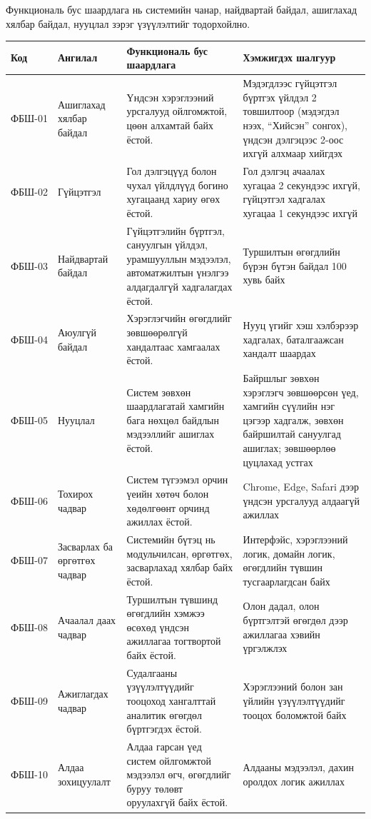 Функциональ бус шаардлага нь системийн чанар, найдвартай байдал, ашиглахад хялбар байдал, нууцлал зэрэг үзүүлэлтийг тодорхойлно.

\begin{longtable}{|L{1.1cm}|L{2.8cm}|L{5.5cm}|L{3.5cm}|}
\hline
\textbf{Код} & \textbf{Ангилал} & \textbf{Функциональ бус шаардлага} & \textbf{Хэмжигдэх шалгуур} \\
\hline
\endhead
ФБШ-01 & Ашиглахад хялбар байдал & Үндсэн хэрэглээний урсгалууд ойлгомжтой, цөөн алхамтай байх ёстой. & Мэдэгдлээс гүйцэтгэл бүртгэх үйлдэл 2 товшилтоор (мэдэгдэл нээх, ``Хийсэн'' сонгох), үндсэн дэлгэцээс 2-оос ихгүй алхмаар хийгдэх \\
\hline
ФБШ-02 & Гүйцэтгэл & Гол дэлгэцүүд болон чухал үйлдлүүд богино хугацаанд хариу өгөх ёстой. & Гол дэлгэц ачаалах хугацаа 2 секундээс ихгүй, гүйцэтгэл хадгалах хугацаа 1 секундээс ихгүй \\
\hline
ФБШ-03 & Найдвартай байдал & Гүйцэтгэлийн бүртгэл, сануулгын үйлдэл, урамшууллын мэдээлэл, автоматжилтын үнэлгээ алдагдалгүй хадгалагдах ёстой. & Туршилтын өгөгдлийн бүрэн бүтэн байдал 100 хувь байх \\
\hline
ФБШ-04 & Аюулгүй байдал & Хэрэглэгчийн өгөгдлийг зөвшөөрөлгүй хандалтаас хамгаалах ёстой. & Нууц үгийг хэш хэлбэрээр хадгалах, баталгаажсан хандалт шаардах \\
\hline
ФБШ-05 & Нууцлал & Систем зөвхөн шаардлагатай хамгийн бага нөхцөл байдлын мэдээллийг ашиглах ёстой. & Байршлыг зөвхөн хэрэглэгч зөвшөөрсөн үед, хамгийн сүүлийн нэг цэгээр хадгалж, зөвхөн байршилтай сануулгад ашиглах; зөвшөөрлөө цуцлахад устгах \\
\hline
ФБШ-06 & Тохирох чадвар & Систем түгээмэл орчин үеийн хөтөч болон хөдөлгөөнт орчинд ажиллах ёстой. & Chrome, Edge, Safari дээр үндсэн урсгалууд алдаагүй ажиллах \\
\hline
ФБШ-07 & Засварлах ба өргөтгөх чадвар & Системийн бүтэц нь модульчилсан, өргөтгөх, засварлахад хялбар байх ёстой. & Интерфэйс, хэрэглээний логик, домайн логик, өгөгдлийн түвшин тусгаарлагдсан байх \\
\hline
ФБШ-08 & Ачаалал даах чадвар & Туршилтын түвшинд өгөгдлийн хэмжээ өсөхөд үндсэн ажиллагаа тогтвортой байх ёстой. & Олон дадал, олон бүртгэлтэй өгөгдөл дээр ажиллагаа хэвийн үргэлжлэх \\
\hline
ФБШ-09 & Ажиглагдах чадвар & Судалгааны үзүүлэлтүүдийг тооцоход хангалттай аналитик өгөгдөл бүртгэгдэх ёстой. & Хэрэглээний болон зан үйлийн үзүүлэлтүүдийг тооцох боломжтой байх \\
\hline
ФБШ-10 & Алдаа зохицуулалт & Алдаа гарсан үед систем ойлгомжтой мэдээлэл өгч, өгөгдлийг буруу төлөвт оруулахгүй байх ёстой. & Алдааны мэдээлэл, дахин оролдох логик ажиллах \\
\hline
\end{longtable}

